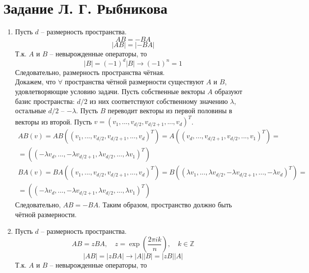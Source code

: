 \documentclass[12pt]{article}
\begin{document}
\section{Задание Л. Г. Рыбникова}
\begin{enumerate}
\item Пусть $d$ -- размерность пространства.
    \begin{equation}
        AB=-BA
    \end{equation}
    \begin{equation}
        |AB|=|-BA|
    \end{equation}
    Т.к. $A$ и $B$ -- невырожденные операторы, то
    \begin{equation}
        |B|=(-1)^d|B|\rightarrow (-1)^n=1
    \end{equation}
    Следовательно, размерность пространства чётная.\\
    Докажем, что $\forall$ пространства чётной размерности существуют $A$ и $B$, удовлетворяющие условию задачи. Пусть собственные векторы $A$ образуют базис пространства: $d/2$ из них соответствуют собственному значению $\lambda$, остальные $d/2$ -- $-\lambda$. Пусть $B$ переводит векторы из первой половины в векторы из второй. Пусть $v=(v_1,...,v_{d/2},v_{d/2+1},...,v_{d})^T$.
    \begin{multline}
        AB(v)=AB((v_1,...,v_{d/2},v_{d/2+1},...,v_{d})^T)=A((v_d,...,v_{d/2+1},v_{d/2},...,v_{1})^T)=\\=((-\lambda v_d,...,-\lambda v_{d/2+1},\lambda v_{d/2},...,\lambda v_{1})^T)
    \end{multline}
    \begin{multline}
        BA(v)=BA((v_1,...,v_{d/2},v_{d/2+1},...,v_{d})^T)=B((\lambda v_1,...,\lambda v_{d/2},-\lambda v_{d/2+1},...,-\lambda v_{d})^T)=\\=((-\lambda v_d,...,-\lambda v_{d/2+1},\lambda v_{d/2},...,\lambda v_{1})^T)
    \end{multline}
    Следовательно, $AB=-BA$. Таким образом, пространство должно быть чётной размерности.
\item Пусть $d$ -- размерность пространства.
\begin{equation}
    AB=zBA,\quad z=\exp\left(\frac{2\pi i k}{n}\right),\quad k\in\mathbb{Z}
\end{equation}
\begin{equation}
    |AB|=|zBA|\rightarrow |A||B|=|zB||A|
\end{equation}
Т.к. $A$ и $B$ -- невырожденные операторы, то
    \begin{equation}

\end{equation}
\end{enumerate}
\end{document}
